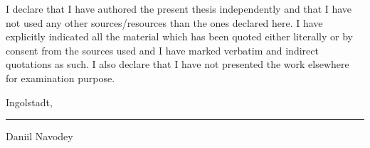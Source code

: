 
I declare that I have authored the present thesis independently and that I have not used any other sources/resources than the ones declared here. I have explicitly indicated all the material which has been quoted either literally or by consent from the sources used and I have marked verbatim and indirect quotations as such. I also declare that I have not presented the work elsewhere for examination purpose.

\vspace*{2.5cm}
	
Ingolstadt, \rule{0.3\textwidth}{0.4pt}	

	
Daniil Navodey
